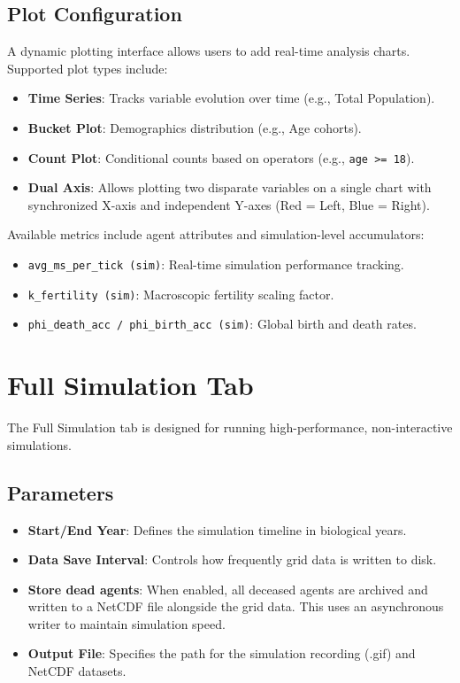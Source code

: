\documentclass[14pt,a4paper]{extreport}
\begin{document}
\section{Plot Configuration}
A dynamic plotting interface allows users to add real-time analysis charts. Supported plot types include:
\begin{itemize}
    \item \textbf{Time Series}: Tracks variable evolution over time (e.g., Total Population).
    \item \textbf{Bucket Plot}: Demographics distribution (e.g., Age cohorts).
    \item \textbf{Count Plot}: Conditional counts based on operators (e.g., \texttt{age >= 18}).
    \item \textbf{Dual Axis}: Allows plotting two disparate variables on a single chart with synchronized X-axis and independent Y-axes (Red = Left, Blue = Right).
\end{itemize}

Available metrics include agent attributes and simulation-level accumulators:
\begin{itemize}
    \item \texttt{avg\_ms\_per\_tick (sim)}: Real-time simulation performance tracking.
    \item \texttt{k\_fertility (sim)}: Macroscopic fertility scaling factor.
    \item \texttt{phi\_death\_acc / phi\_birth\_acc (sim)}: Global birth and death rates.
\end{itemize}

\chapter{Full Simulation Tab}
The Full Simulation tab is designed for running high-performance, non-interactive simulations.

\section{Parameters}
\begin{itemize}
    \item \textbf{Start/End Year}: Defines the simulation timeline in biological years.
    \item \textbf{Data Save Interval}: Controls how frequently grid data is written to disk.
    \item \textbf{Store dead agents}: When enabled, all deceased agents are archived and written to a NetCDF file alongside the grid data. This uses an asynchronous writer to maintain simulation speed.
    \item \textbf{Output File}: Specifies the path for the simulation recording (.gif) and NetCDF datasets.
\end{itemize}
\end{document}
